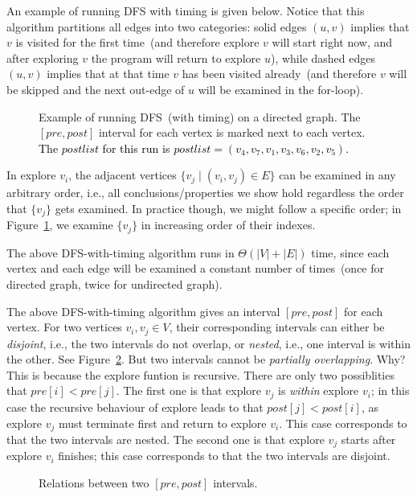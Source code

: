 An example of running DFS with timing is given below.
Notice that this algorithm partitions all edges into two categories:
solid edges $(u,v)$ implies that $v$ is visited for the first time~(and therefore explore $v$ will start right now, and after exploring
$v$ the program will return to explore $u$),
while dashed edges $(u,v)$ implies that at that time $v$ has been visited already~(and therefore $v$ will be skipped and the next 
out-edge of $u$ will be examined in the for-loop). 

\begin{figure}[h!]
\centering{}
\caption{Example of running DFS~(with timing) on a directed graph. 
The $[pre,post]$ interval for each vertex
is marked next to each vertex. 
\textcolor{black}{The $postlist$ for this run is $postlist = (v_4,v_7,v_1,v_3,v_6,v_2,v_5)$.}}
\label{fig:dfs-directed}
\end{figure}


In explore $v_i$, the adjacent vertices $\{v_j \mid
(v_i, v_j)\in E\}$ can be examined in any arbitrary order, i.e., all
conclusions/properties we show hold regardless the order that $\{v_j\}$ gets examined.
In practice though, we might follow a specific order;
in Figure~\ref{fig:dfs-directed}, we examine $\{v_j\}$ in increasing order of their indexes.

The above DFS-with-timing algorithm runs in $\Theta(|V| + |E|)$ time, since
each vertex and each edge will be examined a constant number of times~(once for
directed graph, twice for undirected graph).


The above DFS-with-timing algorithm gives an interval $[pre,post]$ for each vertex.
For two vertices $v_i,v_j\in V$, their corresponding intervals can either be
\emph{disjoint}, i.e., the two intervals do not overlap, or \emph{nested}, i.e.,
one interval is within the other. See Figure~\ref{fig:interval}.
But two intervals cannot be \emph{partially overlapping}. Why? This is because
the explore funtion is recursive. There are only two possiblities
that $pre[i] < pre[j]$. The first one is that explore $v_j$ is \emph{within} explore $v_i$;
in this case the recursive behaviour of explore leads to that $post[j] < post[i]$,
as explore $v_j$ must terminate first and return to explore $v_i$.
This case corresponds to that the two intervals are nested.
The second one is that explore $v_j$ starts after explore $v_i$ finishes;
this case corresponds to that the two intervals are disjoint.

\begin{figure}[h!]
\centering{}
\caption{Relations between two $[pre,post]$ intervals.}
\label{fig:interval}
\end{figure}

